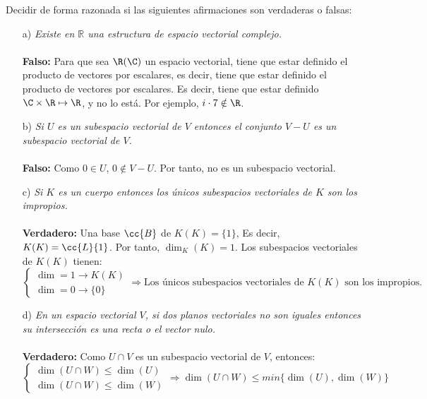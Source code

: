\begin{ejercicio}
	Decidir de forma razonada si las siguientes afirmaciones son verdaderas o falsas:
	\begin{enumerate}
		\item[a)] \textit{Existe en $\mathbb{R}$ una estructura de espacio vectorial complejo.}
			\\ \\
			\textbf{Falso: }Para que sea $\R(\C)$ un espacio vectorial, tiene que estar definido el producto
			de vectores por escalares, es decir, tiene que estar definido el producto de vectores por escalares.
			Es decir, tiene que estar definido $\C \times \R \mapsto \R$, y no lo está.
			Por ejemplo, $i \cdot 7 \notin \R$.
		\item[b)] \textit{Si $U$ es un subespacio vectorial de $V$ entonces el conjunto $V - U$ es un subespacio vectorial de $V$.}
			\\ \\
			\textbf{Falso: } Como $0 \in U$, $ 0 \notin V - U$. Por tanto, no es un subespacio vectorial.
		\item[c)] \textit{Si $K$ es un cuerpo entonces los únicos subespacios vectoriales de $K$ son los impropios.}
			\\ \\
			\textbf{Verdadero: } Una base $\cc{B}$ de $K(K) = \{1\}$, Es decir, $K(K) = \cc{L}\{1\}$. Por tanto, $\dim_K(K) = 1$.
			Los subespacios vectoriales de $K(K)$ tienen:
			\begin{equation*}
				\begin{cases}
					\dim = 1 \rightarrow K(K) \\
					\dim = 0 \rightarrow \{0\}
				\end{cases} \Rightarrow \text{Los únicos subespacios vectoriales de } K(K) \text{ son los impropios.}
			\end{equation*}
		\item[d)] \textit{En un espacio vectorial $V$, si dos planos vectoriales no son iguales entonces su intersección es una recta o el vector nulo.}
			\\ \\ \textbf{Verdadero: } Como $U \cap V$ es un subespacio vectorial de $V$, entonces:
			\begin{equation*}
				\begin{cases}
					\dim(U \cap W) \leq \dim(U) \\
					\dim(U \cap W) \leq \dim(W)
				\end{cases} \Rightarrow \dim(U \cap W) \leq min\{\dim(U), \dim(W)\}

\end{equation*}
\end{enumerate}
\end{ejercicio}

